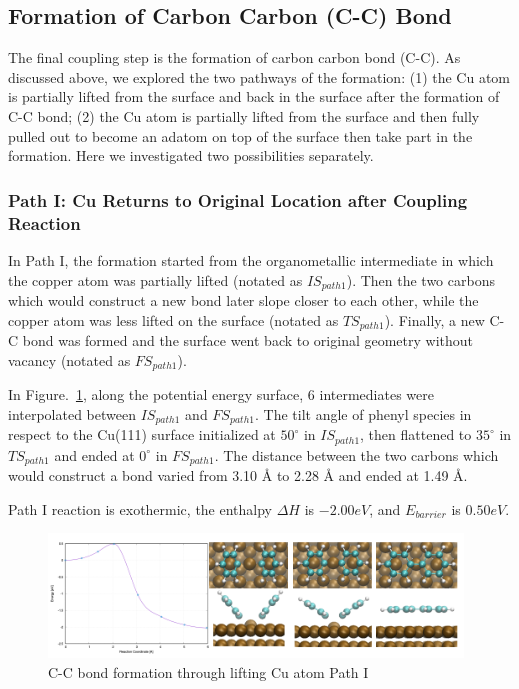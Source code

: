 \documentclass[aps,reprint,amsmath,amssymb]{revtex4-2}
\begin{document}
\subsection{Formation of Carbon Carbon (C-C) Bond}

The final coupling step is the formation of carbon carbon bond (C-C). As discussed above, we explored the two pathways of the formation: (1) the Cu atom is partially lifted from the surface and back in the surface after the formation of C-C bond; (2) the Cu atom is partially lifted from the surface and then fully pulled out to become an adatom on top of the surface then take part in the formation.
Here we investigated two possibilities separately.

\subsubsection{Path I: Cu Returns to Original Location after Coupling Reaction}

In Path I, the formation started from the organometallic intermediate in which the copper atom was partially lifted (notated as $IS_{path1}$). Then the two carbons which would construct a new bond later slope closer to each other, while the copper atom was less lifted on the surface (notated as $TS_{path1}$). Finally, a new C-C bond was formed and the surface went back to original geometry without vacancy (notated as $FS_{path1}$).

In Figure.~\ref{fig:bondformlift}, along the potential energy surface, 6 intermediates were interpolated between $IS_{path1}$ and $FS_{path1}$. The tilt angle of phenyl species in respect to the Cu(111) surface initialized at $50^\circ$ in $IS_{path1}$, then flattened to $35^\circ$ in $TS_{path1}$ and ended at $0^\circ$ in $FS_{path1}$. The distance between the two carbons which would construct a bond varied from 3.10 \si{\angstrom} to 2.28 \si{\angstrom} and ended at 1.49 \si{\angstrom}.

Path I reaction is exothermic, the enthalpy $\Delta H$ is $-2.00 eV$, and $E_{barrier}$ is $0.50 eV$.

\begin{figure}[ht]
\centering
\includegraphics[width=0.98\textwidth]{Fig/bondformlift.png}
\caption{C-C bond formation through lifting Cu atom Path I}
\label{fig:bondformlift}
\end{figure}
\end{document}
